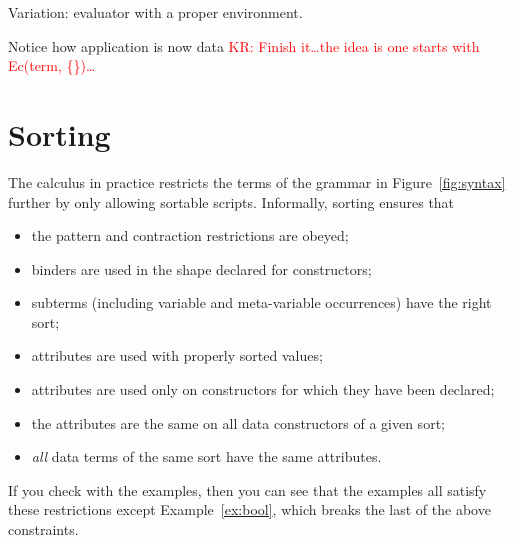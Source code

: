 \documentclass[letterpaper,11pt]{article}
\newcommand{\KR}[1]{\textcolor{red}{KR: #1}}
\begin{document}
\begin{example}
  Variation: evaluator with a proper environment.
  Notice how application is now data
  \KR{Finish it…the idea is one starts with Ec(term, \{\})…}
\end{example}



\section{Sorting}
\label{sec:sorting}

The \hax calculus in practice restricts the terms of the grammar in Figure~\ref{fig:syntax} further
by only allowing sortable scripts. Informally, sorting ensures that
\begin{itemize}
\item the pattern and contraction restrictions are obeyed;
\item binders are used in the shape declared for constructors;
\item subterms (including variable and meta-variable occurrences) have the right sort;
\item attributes are used with properly sorted values;
\item attributes are used only on constructors for which they have been declared;
\item the attributes are the same on all data constructors of a given sort;
\item \emph{all} data terms of the same sort have the same attributes.
\end{itemize}
If you check with the examples, then you can see that the examples all satisfy these restrictions
except Example~\ref{ex:bool}, which breaks the last of the above constraints. 
\end{document}
